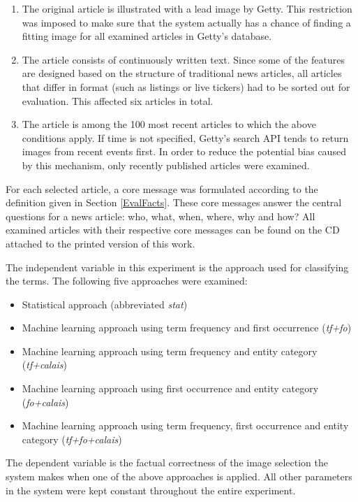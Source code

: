 \documentclass[11pt,a4paper,twoside]{article}
\begin{document}
\begin{enumerate}
    \setlength\itemsep{0em}
    \item The original article is illustrated with a lead image by Getty. This restriction was imposed to make sure that the system actually has a chance of finding a fitting image for all examined articles in Getty's database.
    \item The article consists of continuously written text. Since some of the features are designed based on the structure of traditional news articles, all articles that differ in format (such as listings or live tickers) had to be sorted out for evaluation. This affected six articles in total.
    \item The article is among the 100 most recent articles to which the above conditions apply. If time is not specified, Getty's search API tends to return images from recent events first. In order to reduce the potential bias caused by this mechanism, only recently published articles were examined.
\end{enumerate}

\noindent For each selected article, a core message was formulated according to the definition given in Section \ref{EvalFacts}. These core messages answer the central questions for a news article: who, what, when, where, why and how? All examined articles with their respective core messages can be found on the CD attached to the printed version of this work.

The independent variable in this experiment is the approach used for classifying the terms. The following five approaches were examined:

\begin{itemize}
    \setlength\itemsep{0em}
    \item Statistical approach (abbreviated \emph{stat})
    \item Machine learning approach using term frequency and first occurrence (\emph{tf+fo})
    \item Machine learning approach using term frequency and entity category (\emph{tf+calais})
    \item Machine learning approach using first occurrence and entity category (\emph{fo+calais})
    \item Machine learning approach using term frequency, first occurrence and entity category (\emph{tf+fo+calais})
\end{itemize}

\noindent The dependent variable is the factual correctness of the image selection the system makes when one of the above approaches is applied. All other parameters in the system were kept constant throughout the entire experiment.
\end{document}
